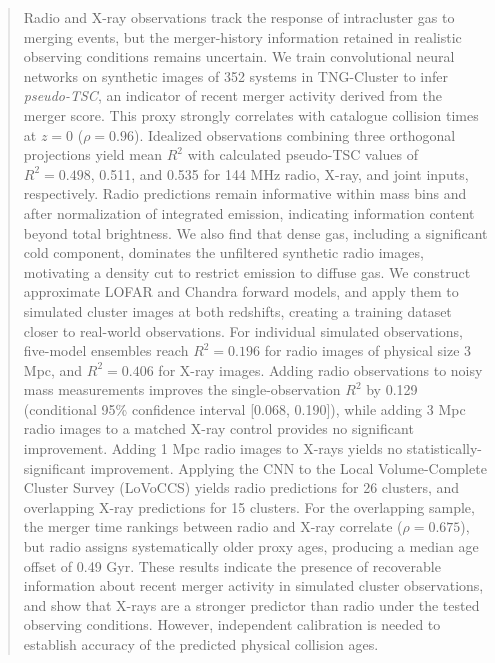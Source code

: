 \begin{abstract}
Radio and X-ray observations track the response of intracluster gas to merging events, but the merger-history information retained in realistic observing conditions remains uncertain.
We train convolutional neural networks on synthetic images of 352 systems in TNG-Cluster to infer \emph{pseudo-TSC}, an indicator of recent merger activity derived from the merger score.
This proxy strongly correlates with catalogue collision times at $z=0$ ($\rho=0.96$).
Idealized observations combining three orthogonal projections yield mean $R^2$ with calculated pseudo-TSC values of $R^2=0.498$, 0.511, and 0.535 for 144 MHz radio, X-ray, and joint inputs, respectively.
Radio predictions remain informative within mass bins and after normalization of integrated emission, indicating information content beyond total brightness.
We also find that dense gas, including a significant cold component, dominates the unfiltered synthetic radio images, motivating a density cut to restrict emission to diffuse gas.
We construct approximate LOFAR and Chandra forward models, and apply them to simulated cluster images at both redshifts, creating a training dataset closer to real-world observations.
For individual simulated observations, five-model ensembles reach $R^2=0.196$ for radio images of physical size 3 Mpc, and $R^2=0.406$ for X-ray images.
Adding radio observations to noisy mass measurements improves the single-observation $R^2$ by 0.129 (conditional 95\% confidence interval [0.068, 0.190]), while adding 3 Mpc radio images to a matched X-ray control provides no significant improvement.
Adding 1 Mpc radio images to X-rays yields no statistically-significant improvement.
Applying the CNN to the Local Volume-Complete Cluster Survey (LoVoCCS) yields radio predictions for 26 clusters, and overlapping X-ray predictions for 15 clusters.
For the overlapping sample, the merger time rankings between radio and X-ray correlate ($\rho=0.675$), but radio assigns systematically older proxy ages, producing a median age offset of 0.49 Gyr.
These results indicate the presence of recoverable information about recent merger activity in simulated cluster observations, and show that X-rays are a stronger predictor than radio under the tested observing conditions.
However, independent calibration is needed to establish accuracy of the predicted physical collision ages.
\end{abstract}
